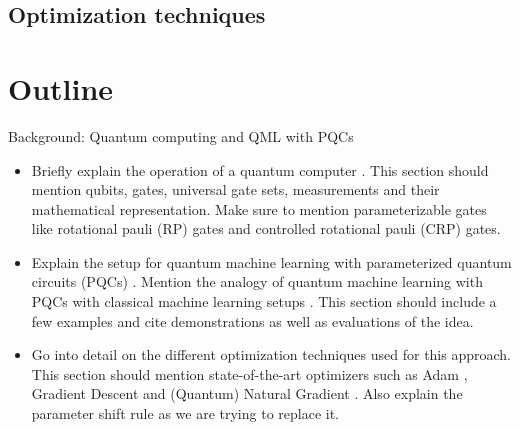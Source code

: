 \subsection{Optimization techniques}

\section{Outline}
Background: Quantum computing and QML with PQCs
\begin{itemize}
    \item
        Briefly explain the operation of a quantum computer
        \cite{nielsen_quantum_2007}.
        This section should mention qubits, gates, universal gate sets,
        measurements and their mathematical representation.
        Make sure to mention parameterizable gates like rotational pauli (RP)
        gates and controlled rotational pauli (CRP) gates.
    \item
        Explain the setup for quantum machine learning with parameterized
        quantum circuits (PQCs) \cite{mitarai_quantum_2018}.
        Mention the analogy of quantum machine learning with PQCs with
        classical machine learning setups \cite{bishop_pattern_2006}.
        This section should include a few examples and cite demonstrations
        as well as evaluations of the idea.
    \item
        Go into detail on the different optimization techniques used for
        this approach.
        This section should mention state-of-the-art optimizers such as
        Adam \cite{kingma_adam_2017}, Gradient Descent and
        (Quantum) Natural Gradient \cite{stokes_quantum_2020}.
        Also explain the parameter shift rule
        \cite{mitarai_quantum_2018,schuld_evaluating_2019} as we are trying
        to replace it.
\end{itemize}

